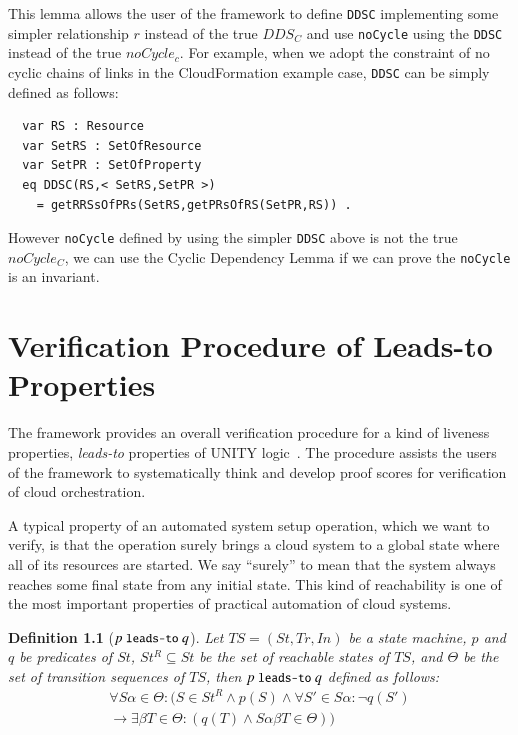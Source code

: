 \documentclass[12pt]{report}
\newtheorem{definition}{Definition}
\newcommand{\ra}{\rightarrow}
\newcommand{\mbstt}[1]{\mbox{\small{\tt {#1}}}}
\newcommand{\ul}{\underline}
\begin{document}
This lemma allows the user of the framework to define {\tt DDSC}
implementing some simpler relationship $r$ instead of the true $DDS_C$
and use {\tt noCycle} using the {\tt DDSC} instead of the true
$noCycle_c$. For example, when we adopt the constraint of no cyclic
chains of links in the CloudFormation example case, {\tt DDSC} can be
simply defined as follows:
\small
\begin{verbatim}
  var RS : Resource
  var SetRS : SetOfResource
  var SetPR : SetOfProperty
  eq DDSC(RS,< SetRS,SetPR >)
    = getRRSsOfPRs(SetRS,getPRsOfRS(SetPR,RS)) .
\end{verbatim}
\normalsize
However {\tt noCycle} defined by using the simpler {\tt DDSC} above is
 not the true $noCycle_C$, we can use the Cyclic Dependency Lemma if
 we can prove the {\tt noCycle} is an invariant.

\chapter{Verification Procedure of Leads-to Properties}
\label{chap:verification}
The framework provides an overall verification procedure for a kind of
liveness properties, {\it leads-to} properties of UNITY
logic~\cite{DBLP:books/daglib/0067338}.  The procedure assists the
users of the framework to systematically think and develop proof
scores for verification of cloud orchestration.

A typical property of an automated system setup operation, which we
want to verify, is that the operation surely brings a cloud system to
a global state where all of its resources are started.  We say ``surely''
to mean that the system always reaches some final state from any
initial state. This kind of reachability is one of the most important
properties of practical automation of cloud systems.

\begin{definition}[$p~\mbstt{leads-to}~q$]
  Let $TS=(St,Tr,In)$ be a state machine, $p$ and $q$ be predicates of
  $St$, $St^R\subseteq St$ be the set of reachable states of $TS$, and
  $\Theta$ be the set of transition sequences of $TS$, then
  \ul{$p~\mbstt{leads-to}~q$} defined as follows:
  \begin{eqnarray*}
  \forall S\alpha\in \Theta: (S\in St^R \land p(S) \land
  \forall S'\in S\alpha: \neg q(S')\\
  \ra \exists \beta T\in \Theta:(q(T) \land S\alpha\beta T\in \Theta))
  \end{eqnarray*}
\end{definition}
\end{document}
